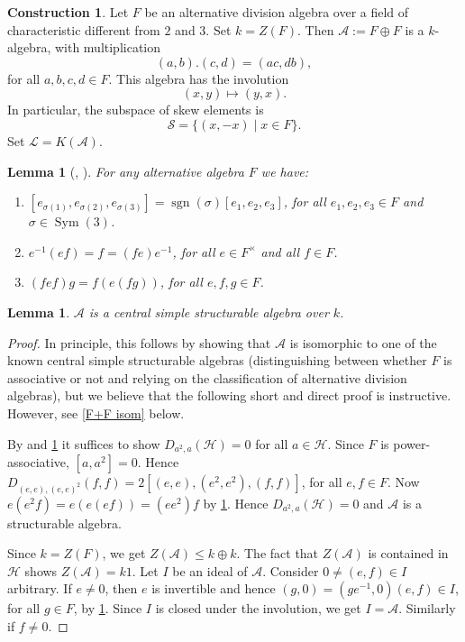 \documentclass[oneside,a4paper]{amsart} %
\newtheorem{lemma}[theorem]{Lemma}
\theoremstyle{definition}
\newtheorem{construction}[theorem]{Construction}
\DeclareMathOperator{\Sym}{Sym}
\DeclareMathOperator{\sign}{sgn}
\newcommand{\A}{\mathcal{A}}
\renewcommand{\SS}{\mathcal{S}}
\newcommand{\HH}{\mathcal{H}}
\newcommand{\LL}{\mathcal{L}}
\numberwithin{equation}{section}
\begin{document}
\begin{construction}
\label{construction exchange algebra}
	Let $F$ be an alternative division algebra over a field of characteristic different from $2$ and $3$.
	Set $k=Z(F)$.
	Then $\A:=F\oplus F$ is a $k$-algebra, with multiplication
	\[ (a,b).(c,d)=(ac,db),\]
	for all $a,b,c,d\in F$.
	This algebra has the involution 
	\[ (x,y)\mapsto (y,x).\]
	In particular, the subspace of skew elements is
	\begin{equation}\label{triangle S}
	   \SS = \{ (x, -x) \mid x \in F \} .
	\end{equation}
	Set $\LL=K(\A)$.
\end{construction}

\begin{lemma}[{\cite[(9.15), (9.22)]{Tits2002}}, {\cite[(3.4)]{Schafer1966}}]
\label{alternative identities}
For any alternative algebra $F$ we have: 
\begin{enumerate}[\rm (i)]
	\item $[e_{\sigma (1)},e_{\sigma (2)},e_{\sigma (3)}]=\sign (\sigma)[e_1,e_2,e_3]$, for all $e_1, e_2, e_3\in F$ and $\sigma\in \Sym(3)$.
	\item\label{alt-id-inv} $e^{-1}(ef)=f=(fe)e^{-1}$, for all $e \in F^\times$ and all $f\in F$.
	\item $(fef)g=f(e(fg))$, for all $e,f,g\in F$.
\end{enumerate}
\end{lemma}

\begin{lemma}
\label{triangle central simple structurable}
	$\A$ is a central simple structurable algebra over $k$.
\end{lemma}
\begin{proof}
    In principle, this follows by showing that $\A$ is isomorphic to one of the known central simple structurable algebras (distinguishing between whether $F$ is associative or not and relying on the classification of alternative division algebras), but we believe that the following short and direct proof is instructive. However, see \cref{F+F isom} below.

	By \cite[Theorem 13]{Allison1978} and \cref{alternative identities} it suffices to show $D_{a^2,a}(\HH)=0$ for all $a\in\HH$.
	Since $F$ is power-associative, $[a,a^2]=0$.
	Hence $D_{(e,e),(e,e)^2}(f,f)=2[(e,e),(e^2,e^2),(f,f)]$, for all $e,f\in F$.
	Now $e(e^2f)=e(e(ef))=(ee^2)f$ by \cref{alternative identities}.
	Hence $D_{a^2,a}(\HH)=0$ and $\A$ is a structurable algebra.
	
	Since $k=Z(F)$, we get $Z(\A)\leq k\oplus k$.
	The fact that $Z(\A)$ is contained in $\HH$ shows $Z(\A)=k1$.
	Let $I$ be an ideal of $\A$.
	Consider $0\neq (e,f)\in I$ arbitrary. 
	If $e\neq 0$, then $e$ is invertible and hence $(g,0)=(ge^{-1},0)(e,f)\in I$, for all $g\in F$, by \cref{alternative identities}.
	Since $I$ is closed under the involution, we get $I=\A$. 
	Similarly if $f\neq 0$.
\end{proof}
\end{document}

